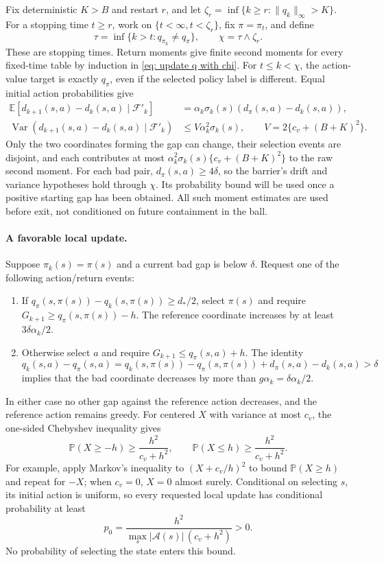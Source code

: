 Fix deterministic $K>B$ and restart $r$, and let $\zeta_r=\inf\{k\ge r:\|q_k\|_\infty>K\}$. For a
stopping time $t\ge r$, work on $\{t<\infty,t<\zeta_r\}$, fix $\pi=\pi_t$, and define
\begin{equation}\label{eq:stops}
\tau=\inf\{k>t:q_{\pi_k}\ne q_\pi\},\qquad \chi=\tau\wedge\zeta_r.
\end{equation}
These are stopping times. Return moments give finite second moments for every fixed-time
table by induction in \eqref{eq: update q with chi}. For $t\le k<\chi$, the action-value target is exactly $q_\pi$, even if the
selected policy label is different. Equal initial action probabilities give
\begin{align}
\mathbb E[d_{k+1}(s,a)-d_k(s,a)\mid\mathcal F'_k]
&=\alpha_k\sigma_k(s)(d_\pi(s,a)-d_k(s,a)),\label{eq:gapdrift}\\
\operatorname{Var}(d_{k+1}(s,a)-d_k(s,a)\mid\mathcal F'_k)
&\le V\alpha_k^2\sigma_k(s),\qquad V=2\{c_v+(B+K)^2\}.\label{eq:gapvariance}
\end{align}
Only the two coordinates forming the gap can change, their selection events are disjoint,
and each contributes at most $\alpha_k^2\sigma_k(s)\{c_v+(B+K)^2\}$ to the raw second moment. For each bad pair, $d_\pi(s,a)\ge4\delta$, so the barrier's drift and variance hypotheses hold through $\chi$. Its probability bound will be used once a positive starting gap has been obtained. All such moment estimates
are used before exit, not conditioned on future containment in the ball.

\paragraph{A favorable local update.}
Suppose $\pi_k(s)=\pi(s)$ and a current
bad gap is below $\delta$. Request one of the following action/return events:
\begin{enumerate}
\item If $q_\pi(s,\pi(s))-q_k(s,\pi(s))\ge d_*/2$, select $\pi(s)$ and require $G_{k+1}\ge q_\pi(s,\pi(s))-h$. The
reference coordinate increases by at least $3\delta\alpha_k/2$.
\item Otherwise select $a$ and require $G_{k+1}\le q_\pi(s,a)+h$. The identity
\[
q_k(s,a)-q_\pi(s,a)=q_k(s,\pi(s))-q_\pi(s,\pi(s))+d_\pi(s,a)-d_k(s,a)>\delta
\]
implies that the bad coordinate decreases by more than $g\alpha_k=\delta\alpha_k/2$.
\end{enumerate}
In either case no other gap against the reference action decreases, and the reference action
remains greedy. For centered $X$ with variance at most $c_v$, the one-sided Chebyshev inequality
gives
\[
\mathbb P(X\ge-h)\ge\frac{h^2}{c_v+h^2},\qquad
\mathbb P(X\le h)\ge\frac{h^2}{c_v+h^2}.
\]
For example, apply Markov's inequality to $(X+c_v/h)^2$ to bound $\mathbb P(X\ge h)$ and repeat for
$-X$; when $c_v=0$, $X=0$ almost surely. Conditional on selecting $s$, its initial action is
uniform, so every requested local update has conditional probability at least
\begin{equation}\label{eq:localprob}
p_0=\frac{h^2}{\max_s|\mathcal A(s)|\,(c_v+h^2)}>0.
\end{equation}
No probability of selecting the state enters this bound.

